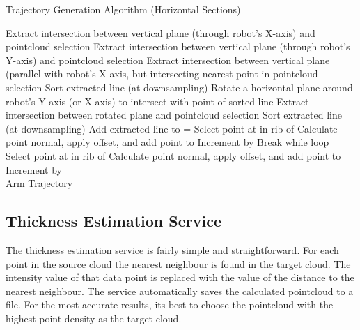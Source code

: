 \begin{spacing}{0.8}
\begin{algorithm}[H]
\caption{Trajectory Generation Algorithm (Horizontal Sections)}
\label{alg:trajh}
\begin{algorithmic}[1]
\begin{raggedright}
\State Extract intersection between vertical plane (through robot's X-axis) and pointcloud selection
\State Extract intersection between vertical plane (through robot's Y-axis) and pointcloud selection
\EndIf
{}
\State Extract intersection between vertical plane (parallel with robot's X-axis, but intersecting nearest point in pointcloud selection
\EndIf 
\State Sort extracted line (at  downsampling)
\State Rotate a horizontal plane around robot's Y-axis (or X-axis) to intersect with point  of sorted line
\State Extract intersection between rotated plane and pointcloud selection
\State Sort extracted line (at  downsampling)
\State Add extracted line to 
\EndFor
\State {} = 
\State Select point at  in rib  of 
\State Calculate point normal, apply offset, and add point to 
\EndFor
\State Increment  by 
\State Break while loop
\EndIf
{}
\State Select point at  in rib  of 
\State Calculate point normal, apply offset, and add point to 
\EndFor
\State Increment  by 
\EndWhile
\EndFunction\\
\Return Arm Trajectory
\end{raggedright}
\end{algorithmic}
\end{algorithm}
\end{spacing}
\subsection{Thickness Estimation Service}

The thickness estimation service is fairly simple and straightforward. For each point in the source cloud the nearest neighbour is found in the target cloud. The intensity value of that data point is replaced with the value of the distance to the nearest neighbour. The service automatically saves the calculated pointcloud to a file. For the most accurate results, its best to choose the pointcloud with the highest point density as the target cloud.\\


